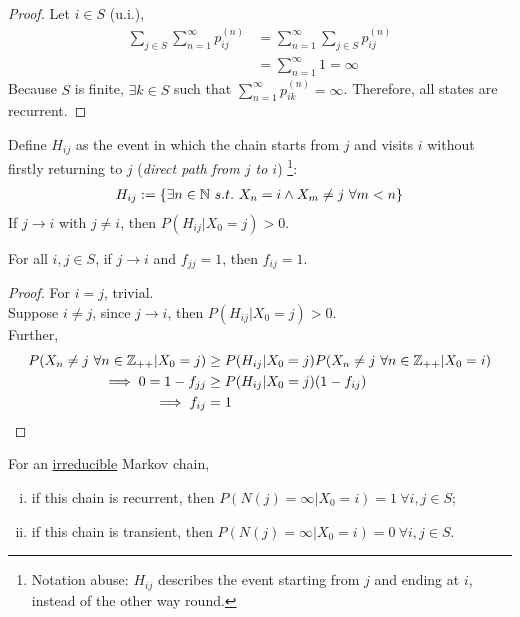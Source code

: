 \documentclass{article}
\newcommand{\upn}[0]{^{(n)}}
\begin{document}
    \begin{proof}
    	Let $i \in S$ (u.i.),
    	\begin{align}
    		\sum_{j \in S} \sum_{n=1}^\infty p_{ij}\upn
    		&= \sum_{n=1}^\infty \sum_{j \in S} p_{ij}\upn \\
    		&= \sum_{n=1}^\infty 1 = \infty
    	\end{align}
    	Because $S$ is finite, $\exists k \in S$ such that $\sum_{n=1}^\infty p_{ik}\upn = \infty$. Therefore, all states are recurrent.
    \end{proof}
    
    \begin{theorem}
    	Define $H_{ij}$ as the event in which the chain starts from $j$ and visits $i$ without firstly returning to $j$ (\emph{direct path from $j$ to $i$}) \footnote{Notation abuse: $H_{ij}$ describes the event starting from $j$ and ending at $i$, instead of the other way round.}:
    	\begin{align}
    		H_{ij} := \{\exists n \in \mathbb{N}\ s.t.\ X_n = i \land X_m \neq j\ \forall m < n\}
    	\end{align}
    	If $j \to i$ with $j \neq i$, then $P(H_{ij}|X_0=j) > 0$.
    \end{theorem}
    
    \begin{theorem}[$f$-Lemma]
    	For all $i, j \in S$, if $j \to i$ and $f_{jj} = 1$, then $f_{ij} = 1$.
    \end{theorem}
    
    \begin{proof}
    	For $i = j$, trivial. \\
    	Suppose $i \neq j$, since $j \to i$, then $P(H_{ij}|X_0=j)> 0$. \\
    	Further,
    	\begin{align}
    		P(X_n \neq j\ \forall n \in \mathbb{Z}_{++} | X_0=j)
    		&\geq P(H_{ij}|X_0=j) P(X_n \neq j\ \forall n \in \mathbb{Z}_{++} | X_0=i)\\
    		\implies 0 = 1 - f_{jj} &\geq P(H_{ij}|X_0=j) (1 - f_{ij}) \\
    		\implies f_{ij} &= 1
    	\end{align}
    \end{proof}
    
    \begin{lemma}
    	For an \ul{irreducible} Markov chain,
    	\begin{enumerate}[(i)]
    		\item if this chain is recurrent, then $P(N(j)=\infty|X_0=i)=1\ \forall i, j \in S$;
    		\item if this chain is transient, then $P(N(j)=\infty|X_0=i)=0\ \forall i, j \in S$.
    	\end{enumerate}
    \end{lemma}
    
\end{document}
